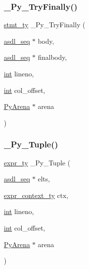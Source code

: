 \subsubsection{\texorpdfstring{\_Py\_TryFinally()}{\_Py\_TryFinally()}}
{\footnotesize\ttfamily \mbox{\hyperlink{_python-ast_8h_a39618071027b661bc03e8916e664e1a7}{stmt\+\_\+ty}} \+\_\+\+Py\+\_\+\+Try\+Finally (\begin{DoxyParamCaption}\item[{\mbox{\hyperlink{structasdl__seq}{asdl\+\_\+seq}} $\ast$}]{body,  }\item[{\mbox{\hyperlink{structasdl__seq}{asdl\+\_\+seq}} $\ast$}]{finalbody,  }\item[{\mbox{\hyperlink{warnings_8h_a74f207b5aa4ba51c3a2ad59b219a423b}{int}}}]{lineno,  }\item[{\mbox{\hyperlink{warnings_8h_a74f207b5aa4ba51c3a2ad59b219a423b}{int}}}]{col\+\_\+offset,  }\item[{\mbox{\hyperlink{pyarena_8h_a9edeb357fbb27333471022a0975adb7a}{Py\+Arena}} $\ast$}]{arena }\end{DoxyParamCaption})}

\mbox{\label{_python-ast_8h_adcbcc2836882c9eda8680dffb9cde4d5}} 
\subsubsection{\texorpdfstring{\_Py\_Tuple()}{\_Py\_Tuple()}}
{\footnotesize\ttfamily \mbox{\hyperlink{_python-ast_8h_a56d3705e020a071405094a220c4592bd}{expr\+\_\+ty}} \+\_\+\+Py\+\_\+\+Tuple (\begin{DoxyParamCaption}\item[{\mbox{\hyperlink{structasdl__seq}{asdl\+\_\+seq}} $\ast$}]{elts,  }\item[{\mbox{\hyperlink{_python-ast_8h_a38710ce394ed6d5cc8ebe79a322dcdf9}{expr\+\_\+context\+\_\+ty}}}]{ctx,  }\item[{\mbox{\hyperlink{warnings_8h_a74f207b5aa4ba51c3a2ad59b219a423b}{int}}}]{lineno,  }\item[{\mbox{\hyperlink{warnings_8h_a74f207b5aa4ba51c3a2ad59b219a423b}{int}}}]{col\+\_\+offset,  }\item[{\mbox{\hyperlink{pyarena_8h_a9edeb357fbb27333471022a0975adb7a}{Py\+Arena}} $\ast$}]{arena }\end{DoxyParamCaption})}

